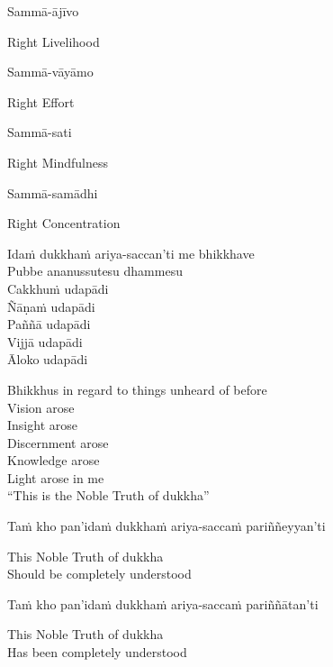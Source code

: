 Sammā-ājīvo

\begin{english}
  Right Livelihood
\end{english}

Sammā-vāyāmo

\begin{english}
  Right Effort
\end{english}

Sammā-sati

\begin{english}
  Right Mindfulness
\end{english}

Sammā-samādhi

\begin{english}
  Right Concentration
\end{english}

Idaṁ dukkhaṁ ariya-saccan’ti me bhikkhave\\
Pubbe ananussutesu dhammesu\\
Cakkhuṁ udapādi\\
Ñāṇaṁ udapādi\\
Paññā udapādi\\
Vijjā udapādi\\
Āloko udapādi

\begin{english}
  Bhikkhus in regard to things unheard of before\\
  Vision arose\\
  Insight arose\\
  Discernment arose\\
  Knowledge arose\\
  Light arose in me\\
  “This is the Noble Truth of dukkha”
\end{english}

Taṁ kho pan’idaṁ dukkhaṁ ariya-saccaṁ pariññeyyan’ti

\begin{english}
  This Noble Truth of dukkha\\
  Should be completely understood
\end{english}

Taṁ kho pan’idaṁ dukkhaṁ ariya-saccaṁ pariññātan’ti

\begin{english}
  This Noble Truth of dukkha\\
  Has been completely understood
\end{english}


